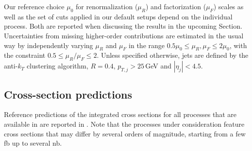 \documentclass[english,11pt]{article}
\begin{document}
\newcommand{\ptjet}{\ensuremath{p_{T,j}}}

Our reference choice $\mu_0$ for renormalization ($\mu_R$) and factorization ($\mu_F$) scales as well as the set of cuts applied 
in our default setups depend on the individual process. Both are reported when discussing the results in the upcoming Section. 
Uncertainties from missing higher-order contributions are estimated in the usual way
by independently varying $\mu_R$ and $\mu_F$ in the range $0.5\mu_0\le \mu_R,\mu_F\le 2 \mu_0$, with the constraint $0.5\le \mu_R/\mu_F\le 2$. 
Unless specified otherwise, jets are defined by the anti-$k_T$ clustering algorithm, $R=0.4$, $\ptjet>25$\,GeV and $|\eta_j|<4.5$.

\subsection{Cross-section predictions}\label{sec:cs}

Reference predictions of the integrated cross sections for all processes that are available in \Matrix{} are reported in . 
Note that the processes under consideration feature 
cross sections that may differ by several orders of magnitude, starting from a few fb up to several nb.
\end{document}
